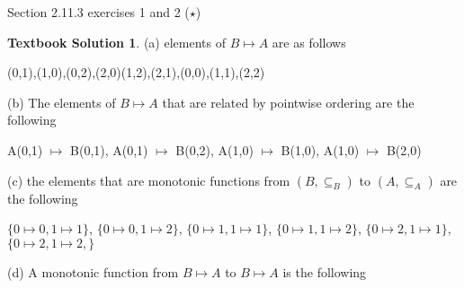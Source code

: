 \documentclass[10pt]{article}
\theoremstyle{definition}
\newtheorem{ts}{Textbook Solution}
\begin{document}
  
  
  Section 2.11.3 exercises 1 and 2 ($\star$)
  
  \begin{ts}
  
  (a) elements of $ B \mapsto A$ are as follows
  
  (0,1),(1,0),(0,2),(2,0)(1,2),(2,1),(0,0),(1,1),(2,2)
  
  (b) The elements of $ B \mapsto A$ that are related by pointwise ordering are the following
  
  A(0,1) $\mapsto$ B(0,1), A(0,1) $\mapsto$ B(0,2), A(1,0) $\mapsto$ B(1,0), A(1,0) $\mapsto$ B(2,0)
  
  (c) the elements that are monotonic functions from $(B,\subseteq_B)$ to $(A,\subseteq_A)$ are the following
  
  $\{0 \mapsto 0, 1 \mapsto 1\}$, $\{0 \mapsto 0, 1 \mapsto 2\}$, $\{0 \mapsto 1, 1 \mapsto 1\}$, $\{0 \mapsto 1, 1 \mapsto 2\}$, $\{0 \mapsto 2, 1 \mapsto 1\}$, $\{0 \mapsto 2, 1 \mapsto 2, \}$
  
  (d) A monotonic function from $B \mapsto A$ to $B \mapsto A$ is the following
  
  
  
  
  \end{ts}
  
  
  
\end{document}
